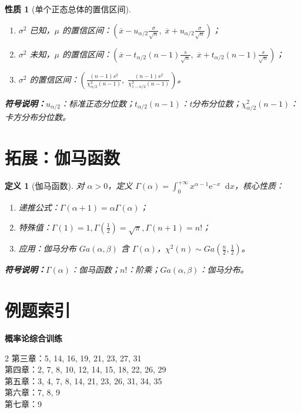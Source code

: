 \documentclass{article}
\newcommand{\dif}{\mathop{}\!\mathrm{d}}
\newcommand{\e}{\mathrm{e}}
\newcommand{\samplemean}[1]{\overline{#1}}
\newcommand{\symnote}[1]{\par\noindent\textbf{符号说明：}#1\par}
\newcommand{\ualpha}{u_{\alpha/2}}
\newcommand{\talpha}[1]{t_{\alpha/2}(#1)}
\newcommand{\xalpha}[1]{\chi^2_{\alpha/2}(#1)}
\newcommand{\xalphaone}[1]{\chi^2_{1-\alpha/2}(#1)}
\theoremstyle{mytheorem}
\newtheorem{definition}{定义}[section]
\newtheorem{property}{性质}[section]
\begin{document}
\begin{property}[单个正态总体的置信区间]
\begin{enumerate}
    \item $\sigma^2$ 已知，$\mu$ 的置信区间：$\left( \samplemean{x}-\ualpha \frac{\sigma}{\sqrt{n}},\; \samplemean{x}+\ualpha \frac{\sigma}{\sqrt{n}} \right)$；
    \item $\sigma^2$ 未知，$\mu$ 的置信区间：$\left( \samplemean{x}-\talpha{n-1}\frac{s}{\sqrt{n}},\; \samplemean{x}+\talpha{n-1}\frac{s}{\sqrt{n}} \right)$；
    \item $\sigma^2$ 的置信区间：$\left( \frac{(n-1)s^2}{\xalpha{n-1}},\; \frac{(n-1)s^2}{\xalphaone{n-1}} \right)$。
\end{enumerate}
\symnote{$\ualpha$：标准正态分位数；$\talpha{n-1}$：t分布分位数；$\xalpha{n-1}$：卡方分布分位数。}
\end{property}

\section{拓展：伽马函数}
\begin{definition}[伽马函数]
对 $\alpha > 0$，定义 $\Gamma(\alpha) = \int_{0}^{+\infty} x^{\alpha-1} \e^{-x} \dif x$，核心性质：
\begin{enumerate}
    \item 递推公式：$\Gamma(\alpha+1) = \alpha \Gamma(\alpha)$；
    \item 特殊值：$\Gamma(1)=1, \Gamma\left(\frac{1}{2}\right)=\sqrt{\pi}, \Gamma(n+1)=n!$；
    \item 应用：伽马分布 $Ga(\alpha,\beta)$ 含 $\Gamma(\alpha)$，$\chi^2(n) \sim Ga\left(\frac{n}{2},\frac{1}{2}\right)$。
\end{enumerate}
\symnote{$\Gamma(\alpha)$：伽马函数；$n!$：阶乘；$Ga(\alpha,\beta)$：伽马分布。}
\end{definition}

\section{例题索引}
\noindent \textbf{概率论综合训练} \\
\begin{multicols}{2}
\RaggedRight
第三章：5, 14, 16, 19, 21, 23, 27, 31 \\
第四章：2, 7, 8, 10, 12, 14, 15, 18, 22, 26, 29 \\
第五章：3, 4, 7, 8, 14, 21, 23, 26, 31, 34, 35 \\
第六章：7, 8, 9 \\
第七章：9
\end{multicols}
\end{document}
